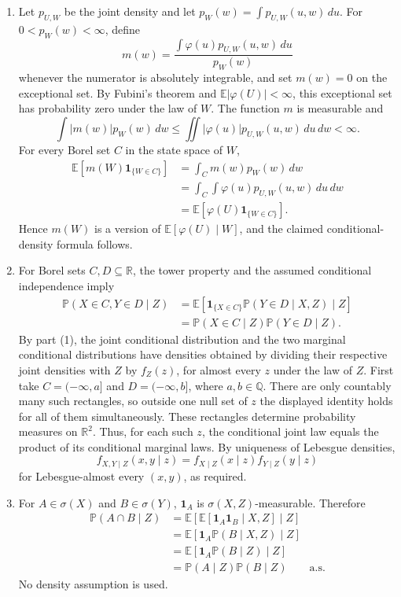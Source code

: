 \documentclass[lang=en,11pt,a4paper,citestyle=authoryear]{elegantpaper}
\newcommand{\R}{\mathbb{R}}
\newcommand{\E}{\mathbb{E}}
\renewcommand{\P}{\mathbb{P}}
\begin{document}
\begin{enumerate}[label=(\arabic*),leftmargin=*]
\item Let $p_{U,W}$ be the joint density and let
$p_W(w)=\int p_{U,W}(u,w)\,du$. For $0<p_W(w)<\infty$, define
\[
m(w)=\frac{\int\varphi(u)p_{U,W}(u,w)\,du}{p_W(w)}
\]
whenever the numerator is absolutely integrable, and set $m(w)=0$ on the exceptional set. By Fubini's theorem and $\E|\varphi(U)|<\infty$, this exceptional set has probability zero under the law of $W$. The function $m$ is measurable and
\[
\int |m(w)|p_W(w)\,dw\leq
\iint |\varphi(u)|p_{U,W}(u,w)\,du\,dw<\infty.
\]
For every Borel set $C$ in the state space of $W$,
\[
\begin{aligned}
\E[m(W)\mathbf{1}_{\{W\in C\}}]
&=\int_C m(w)p_W(w)\,dw\\
&=\int_C\int\varphi(u)p_{U,W}(u,w)\,du\,dw\\
&=\E[\varphi(U)\mathbf{1}_{\{W\in C\}}].
\end{aligned}
\]
Hence $m(W)$ is a version of $\E[\varphi(U)\mid W]$, and the claimed conditional-density formula follows.

\item For Borel sets $C,D\subseteq\R$, the tower property and the assumed conditional independence imply
\[
\begin{aligned}
\P(X\in C,Y\in D\mid Z)
&=\E[\mathbf{1}_{\{X\in C\}}\P(Y\in D\mid X,Z)\mid Z]\\
&=\P(X\in C\mid Z)\P(Y\in D\mid Z).
\end{aligned}
\]
By part (1), the joint conditional distribution and the two marginal conditional distributions have densities obtained by dividing their respective joint densities with $Z$ by $f_Z(z)$, for almost every $z$ under the law of $Z$.
First take $C=(-\infty,a]$ and $D=(-\infty,b]$, where $a,b\in\mathbb{Q}$. There are only countably many such rectangles, so outside one null set of $z$ the displayed identity holds for all of them simultaneously. These rectangles determine probability measures on $\R^2$. Thus, for each such $z$, the conditional joint law equals the product of its conditional marginal laws. By uniqueness of Lebesgue densities,
\[
f_{X,Y\mid Z}(x,y\mid z)=f_{X\mid Z}(x\mid z)f_{Y\mid Z}(y\mid z)
\]
for Lebesgue-almost every $(x,y)$, as required.

\item For $A\in\sigma(X)$ and $B\in\sigma(Y)$, $\mathbf{1}_A$ is $\sigma(X,Z)$-measurable. Therefore
\[
\begin{aligned}
\P(A\cap B\mid Z)
&=\E[\E[\mathbf{1}_A\mathbf{1}_B\mid X,Z]\mid Z]\\
&=\E[\mathbf{1}_A\P(B\mid X,Z)\mid Z]\\
&=\E[\mathbf{1}_A\P(B\mid Z)\mid Z]\\
&=\P(A\mid Z)\P(B\mid Z)\qquad\text{a.s.}
\end{aligned}
\]
No density assumption is used.


\end{enumerate}
\end{document}
